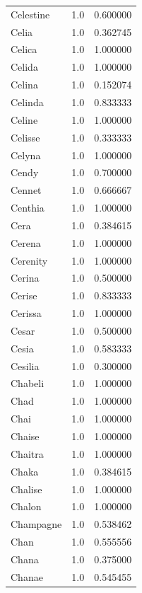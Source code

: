 \documentclass[
  letterpaper,
  DIV=11,
  numbers=noendperiod]{scrreprt}
\begin{document}
\begin{tabular}{lrr}
Celestine       &   1.0 &   0.600000 \\
Celia           &   1.0 &   0.362745 \\
Celica          &   1.0 &   1.000000 \\
Celida          &   1.0 &   1.000000 \\
Celina          &   1.0 &   0.152074 \\
Celinda         &   1.0 &   0.833333 \\
Celine          &   1.0 &   1.000000 \\
Celisse         &   1.0 &   0.333333 \\
Celyna          &   1.0 &   1.000000 \\
Cendy           &   1.0 &   0.700000 \\
Cennet          &   1.0 &   0.666667 \\
Centhia         &   1.0 &   1.000000 \\
Cera            &   1.0 &   0.384615 \\
Cerena          &   1.0 &   1.000000 \\
Cerenity        &   1.0 &   1.000000 \\
Cerina          &   1.0 &   0.500000 \\
Cerise          &   1.0 &   0.833333 \\
Cerissa         &   1.0 &   1.000000 \\
Cesar           &   1.0 &   0.500000 \\
Cesia           &   1.0 &   0.583333 \\
Cesilia         &   1.0 &   0.300000 \\
Chabeli         &   1.0 &   1.000000 \\
Chad            &   1.0 &   1.000000 \\
Chai            &   1.0 &   1.000000 \\
Chaise          &   1.0 &   1.000000 \\
Chaitra         &   1.0 &   1.000000 \\
Chaka           &   1.0 &   0.384615 \\
Chalise         &   1.0 &   1.000000 \\
Chalon          &   1.0 &   1.000000 \\
Champagne       &   1.0 &   0.538462 \\
Chan            &   1.0 &   0.555556 \\
Chana           &   1.0 &   0.375000 \\
Chanae          &   1.0 &   0.545455 \\

\end{tabular}
\end{document}
